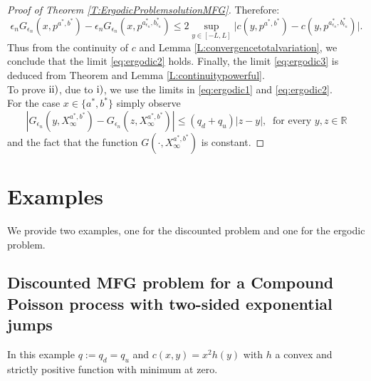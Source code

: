 \documentclass{article}
\begin{document}
\begin{proof}[Proof of Theorem \ref{T:ErgodicProblemsolutionMFG}]
Therefore:
\begin{equation}\label{eq:ergodic4}
\epsilon_n G_{\epsilon_n}(x,p^{a^{\ast},b^{\ast}}) - \epsilon_n G_{\epsilon_n}(x,p^{a^{\ast}_{\epsilon_n},b^{\ast}_{\epsilon_n}}) \leq 2 \sup_{y \in [-L,L]} \vert c(y,p^{a^{\ast},b^{\ast}})-c(y,p^{a^{\ast}_{\epsilon_n},b^{\ast}_{\epsilon_n}}) \vert . 
\end{equation}
%
Thus from the continuity of $c$ and Lemma \ref{L:convergencetotalvariation}, we conclude that the limit \eqref{eq:ergodic2} holds. Finally, the limit \eqref{eq:ergodic3} is deduced from Theorem \cite[Theorem 1]{MO}  and Lemma \ref{L:continuitypowerful}. \\ 
% 
To prove $\rm{ii)}$, due to $\rm{i)}$, we use the limits in \eqref{eq:ergodic1} and \eqref{eq:ergodic2}. \\
For the case $x \in \lbrace a^\ast,b^\ast \rbrace$ simply observe $$ \left| G_{\epsilon_n}(y,X^{a^\ast,b^\ast}_{\infty})- G_{\epsilon_n}(z,X^{a^\ast,b^\ast}_{\infty}) \right| \leq  (q_d+q_u) \left| z-y \right| , \ \text{ for every } y,z \in \mathbb{R}$$ and the fact that the function $G(\cdot , X_{\infty}^{a^{\ast},b^{\ast}})$ is constant.
%
\end{proof}
%

\section{Examples}\label{C43:Examples}
We provide two examples, one for the discounted problem and one for the ergodic problem.
%
\subsection{Discounted MFG problem for a Compound Poisson process with two-sided exponential jumps}\label{ExamplePoissonMFG}
In this example $q:=q_d=q_u$ and $c(x,y)=x^2 h(y)$ with $h$ a convex and strictly positive function with minimum at zero.
\end{document}
